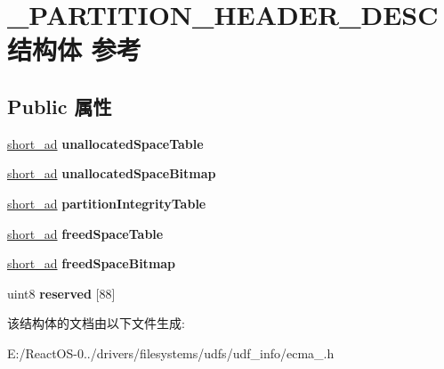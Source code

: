 \hypertarget{struct___p_a_r_t_i_t_i_o_n___h_e_a_d_e_r___d_e_s_c}{}\section{\+\_\+\+P\+A\+R\+T\+I\+T\+I\+O\+N\+\_\+\+H\+E\+A\+D\+E\+R\+\_\+\+D\+E\+S\+C结构体 参考}
\label{struct___p_a_r_t_i_t_i_o_n___h_e_a_d_e_r___d_e_s_c}
\subsection*{Public 属性}
\begin{DoxyCompactItemize}
\item 
\mbox{\label{struct___p_a_r_t_i_t_i_o_n___h_e_a_d_e_r___d_e_s_c_a90312ea1e9c7eb9a5d67a5f554508a22}} 
\hyperlink{struct___s_h_o_r_t___a_d}{short\+\_\+ad} {\bfseries unallocated\+Space\+Table}
\item 
\mbox{\label{struct___p_a_r_t_i_t_i_o_n___h_e_a_d_e_r___d_e_s_c_a1fa3b58e0b3ad140a192782c53ca21e2}} 
\hyperlink{struct___s_h_o_r_t___a_d}{short\+\_\+ad} {\bfseries unallocated\+Space\+Bitmap}
\item 
\mbox{\label{struct___p_a_r_t_i_t_i_o_n___h_e_a_d_e_r___d_e_s_c_a4a19218a61cb92cc8771d5b4bfa43b3e}} 
\hyperlink{struct___s_h_o_r_t___a_d}{short\+\_\+ad} {\bfseries partition\+Integrity\+Table}
\item 
\mbox{\label{struct___p_a_r_t_i_t_i_o_n___h_e_a_d_e_r___d_e_s_c_acb189a9f1aa0013a7f03d8a438887154}} 
\hyperlink{struct___s_h_o_r_t___a_d}{short\+\_\+ad} {\bfseries freed\+Space\+Table}
\item 
\mbox{\label{struct___p_a_r_t_i_t_i_o_n___h_e_a_d_e_r___d_e_s_c_ae029e74a9c68a0d0dfb3b74179c7e691}} 
\hyperlink{struct___s_h_o_r_t___a_d}{short\+\_\+ad} {\bfseries freed\+Space\+Bitmap}
\item 
\mbox{\label{struct___p_a_r_t_i_t_i_o_n___h_e_a_d_e_r___d_e_s_c_a37fc213be501dc56eedcd5224209c06f}} 
uint8 {\bfseries reserved} \mbox{[}88\mbox{]}
\end{DoxyCompactItemize}


该结构体的文档由以下文件生成\+:\begin{DoxyCompactItemize}
\item 
E\+:/\+React\+O\+S-\/0../drivers/filesystems/udfs/udf\+\_\+info/ecma\+\_.\+h\end{DoxyCompactItemize}
